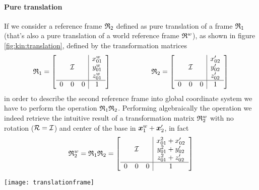		\paragraph{Pure translation} If we consider a reference frame $\mathfrak {R}_{2}$ defined as pure translation of a frame $\mathfrak {R}_{1}$ (that's also a pure translation of a world reference frame $\mathfrak{R}^w$), as shown in figure \ref{fig:kin:translation}, defined by the transformation matrices 
		\[ \mathfrak {R}_{1} = \begin{bmatrix}  \begin{array}{c c c | c}  &&& x_{01}^w \\ & \mathcal I&& y_{01}^w \\ &&& z_{01}^w \\ \hline 0 & 0 & 0 & 1  \end{array} \end{bmatrix} \hspace{2cm} \mathfrak {R}_{2} = \begin{bmatrix}  \begin{array}{c c c | c}  &&& x_{02}' \\ & \mathcal I&& y_{02}' \\ &&& z_{02}' \\ \hline 0 & 0 & 0 & 1  \end{array} \end{bmatrix} \]
		in order to describe the second reference frame into global coordinate system we have to perform the operation $\mathfrak {R}_{1} \mathfrak {R}_{2}$. Performing algebraically the operation we indeed retrieve the intuitive result of a transformation matrix $\mathfrak {R}_{2}^w$ with no rotation ($\mathcal R = \mathcal I$) and center of the base in  $\boldsymbol{x}_1^w + \boldsymbol{x}_2'$, in fact
		\[ \mathfrak {R}_{2}^w = \mathfrak {R}_{1}\mathfrak {R}_{2} = \begin{bmatrix}  \begin{array}{c c c | c}  &&& x_{01}^2 + x_{02}' \\ & \mathcal I&& y_{01}^2 + y_{02}' \\ &&& z_{01}^2 + z_{02}' \\ \hline 0 & 0 & 0 & 1  \end{array} \end{bmatrix} \]
		
		\begin{SCfigure}[2][bht]
			\centering \texttt{[image: translationframe]}
			\caption{multiple transformations of pure translation; in this case, for sake of simplicity, the planar case has been considered.} \label{fig:kin:translation}
		\end{SCfigure}
	
